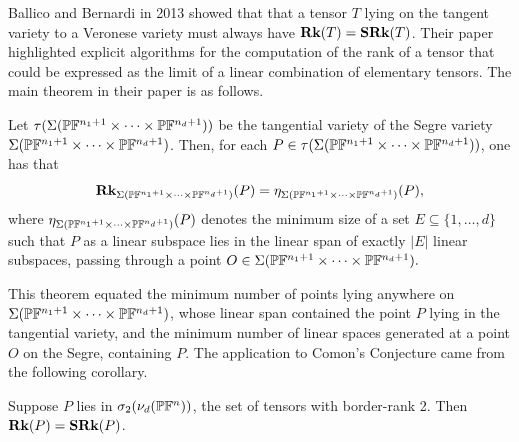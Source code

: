 \documentclass[../Lael_John_MasterThesis_Draft.tex]{subfiles}
\begin{document}
Ballico and Bernardi \cite{ballico_tensor_2013} in 2013 showed that that a tensor $T$ lying on the tangent variety to a Veronese variety must always have $\textbf{Rk}(T) = \textbf{SRk}(T)$. Their paper highlighted explicit algorithms for the computation of the rank of a tensor that could be expressed as the limit of a linear combination of elementary tensors. The main theorem in their paper is as follows.
\begin{theorem}\label{thm:tangenttosegre}
	Let $\tau(\Sigma(\mathbb{P} \mathbb{F}^{n_1+1} \times \cdots \times \mathbb{P} \mathbb{F}^{n_d +1}))$ be the tangential variety of the Segre variety $\Sigma(\mathbb{P} \mathbb{F}^{n_1+1} \times \cdots \times \mathbb{P} \mathbb{F}^{n_d +1})$. Then, for each $P \in \tau(\Sigma(\mathbb{P} \mathbb{F}^{n_1+1} \times \cdots \times \mathbb{P} \mathbb{F}^{n_d +1}))$, one has that $$\textbf{Rk}_{\Sigma(\mathbb{P} \mathbb{F}^{n_1+1} \times \cdots \times \mathbb{P} \mathbb{F}^{n_d +1})}(P) = \eta_{\Sigma(\mathbb{P} \mathbb{F}^{n_1+1} \times \cdots \times \mathbb{P} \mathbb{F}^{n_d +1})}(P),$$ where $\eta_{\Sigma(\mathbb{P} \mathbb{F}^{n_1+1} \times \cdots \times \mathbb{P} \mathbb{F}^{n_d +1})}(P)$ denotes the minimum size of a set $E \subseteq \{1, \ldots, d\}$ such that $P$ as a linear subspace lies in the linear span of exactly $|E|$ linear subspaces, passing through a point $O \in \Sigma(\mathbb{P} \mathbb{F}^{n_1+1} \times \cdots \times \mathbb{P} \mathbb{F}^{n_d +1}).$
\end{theorem}
\begin{remark}
	This theorem equated the minimum number of points lying anywhere on $\Sigma(\mathbb{P} \mathbb{F}^{n_1+1} \times \cdots \times \mathbb{P} \mathbb{F}^{n_d +1})$, whose linear span contained the point $P$ lying in the tangential variety, and the minimum number of linear spaces generated at a point $O$ on the Segre, containing $P$.
	The application to Comon's Conjecture came from the following corollary.
\end{remark}
\begin{corollary}
	Suppose $P$ lies in $\sigma_2(\nu_d(\mathbb{P} \mathbb{F}^n))$, the set of tensors with border-rank 2. Then $\textbf{Rk}(P) = \textbf{SRk}(P)$.
\end{corollary}


\end{document}
